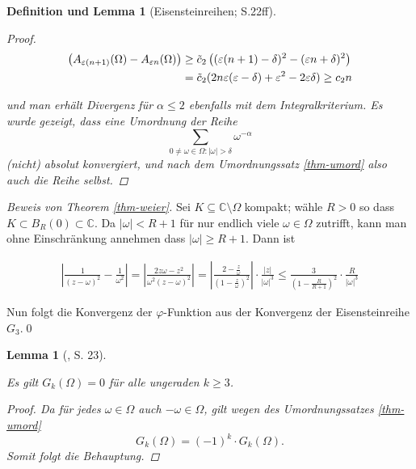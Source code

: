 \documentclass[12pt]{article}
\newtheorem{lemma}[theorem]{Lemma}
\newtheorem{deflemma}[theorem]{Definition und Lemma}
\numberwithin{equation}{section}
\newcommand{\kk}{\cite{kk} }
\begin{document}
\begin{deflemma}[Eisensteinreihen; \kk S.22ff]
\begin{proof}
\begin{align}
     \left( A_{\varepsilon (n+1)}(\Omega) - A_{\varepsilon n}(\Omega) \right) &\ge \tilde c_2 \left(  (\varepsilon (n +1) - \delta )^2 - (\varepsilon n +  \delta )^2  \right) \\
&= \tilde c_2 (2n \varepsilon (\varepsilon  - \delta ) + \varepsilon^2 - 2\varepsilon \delta) \ge c_2 n
\end{align}

und man erhält Divergenz für \(\alpha \le 2\) ebenfalls mit dem
Integralkriterium. Es wurde gezeigt, dass eine Umordnung der Reihe
\begin{equation}{
\sum_{0 \ne \omega \in \Omega : |\omega| > \delta}  \omega^{-\alpha}
}\end{equation} (nicht) absolut konvergiert, und nach dem Umordnungssatz
\ref{thm-umord} also auch die Reihe selbst.

\end{proof}

\end{deflemma}

\emph{Beweis von Theorem \ref{thm-weier}.} Sei
\(K \subseteq \mathbb C \setminus \Omega\) kompakt; wähle \(R > 0\) so
dass \(K \subset B_R(0)\subset \mathbb C\). Da \(|\omega | < R+1\) für
nur endlich viele \(\omega \in \Omega\) zutrifft, kann man ohne
Einschränkung annehmen dass \(|\omega | \ge R+1\). Dann ist

\begin{align}
    \left | \frac{1}{(z-\omega )^2} - \frac{1}{\omega ^2}   \right | = \left | \frac{2z\omega - z^2 }{\omega ^2 (z-\omega )^2}   \right | = \left | \frac{2 - \frac{z}{\omega } }{(1-\frac{z}{\omega } )^2}   \right | \cdot \frac{|z|}{|\omega |^3} \le \frac{3}{(1 - \frac{R}{R+1} )^2} \cdot \frac{R}{|\omega |^3}
\end{align}

Nun folgt die Konvergenz der \(\varphi\)-Funktion aus der Konvergenz der
Eisensteinreihe \(G_3\).\qed

\begin{lemma}[\cite{kk}, S. 23]\label{lem-ungerade-eisenstein}

Es gilt \(G_k(\Omega)=0\) für alle ungeraden \(k \ge 3\).

\begin{proof}

Da für jedes \(\omega \in \Omega\) auch \(-\omega \in \Omega\), gilt
wegen des Umordnungssatzes \ref{thm-umord} \begin{equation}{
G_k(\Omega) = (-1)^k \cdot G_k(\Omega).
}\end{equation} Somit folgt die Behauptung.

\end{proof}

\end{lemma}
\end{document}
